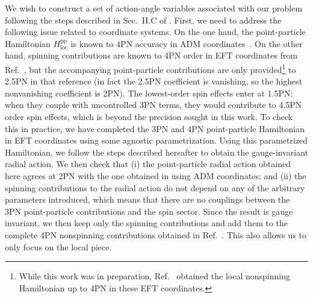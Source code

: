 \documentclass[prd,superscriptaddress,preprintnumbers,tightenlines,nofootinbib, eqsecnum]{revtex4-2}
\begin{document}
We wish to construct a set of action-angle variables associated with our problem following the steps described in Sec.~II.C of \cite{Trestini:2025yyc}. 
First, we need to address the following issue related to coordinate systems. On the one hand, the point-particle Hamiltonian $H_\text{loc}^\text{pp}$ is known to 4PN accuracy in ADM coordinates~\cite{Jaranowski:2015lha}. On the other hand, spinning contributions are known to 4PN order in EFT coordinates from Ref.~\cite{Levi:2016ofk}, but the accompanying point-particle contributions are only provided\footnote{While this work was in preparation, Ref.~\cite{Blanchet:2026wwa} obtained the local nonspinning Hamiltonian up to 4PN in these EFT coordinates.} to 2.5PN in that reference (in fact the 2.5PN coefficient is vanishing, so the highest nonvanishing coefficient is 2PN). The lowest-order spin effects enter at 1.5PN: when they couple with uncontrolled 3PN terms, they would contribute to 4.5PN order spin effects, which is beyond the precision sought in this work. To check this in practice, we have completed the 3PN and 4PN point-particle Hamiltonian in EFT coordinates using some agnostic parametrization. Using this parametrized Hamiltonian, we follow the steps described hereafter to obtain the gauge-invariant radial action. We then check that (i) the point-particle radial action obtained here agrees at 2PN with the one obtained in \cite{Trestini:2025yyc} using ADM coordinates; and (ii) the spinning contributions to the radial action do not depend on any of the arbitrary parameters introduced, which means that there are no couplings between the 3PN point-particle contributions and the spin sector. Since the result is gauge invariant, we then keep only the spinning contributions and add them to the complete 4PN nonspinning contributions obtained in Ref.~\cite{Trestini:2025yyc}. This also allows us to only focus on the local piece.
\end{document}
